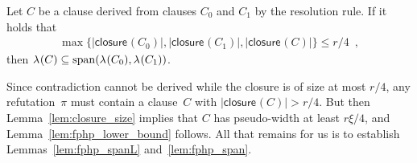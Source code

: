 \documentclass{theoretics}
\newcommand{\maxofexpr}[2][]{\max_{#1} \{ #2 \}}
\newcommand{\setsize}[1]{\lvert#1\rvert}
\newcommand{\eqcomma}{\enspace ,}
\newcommand{\reflem}[1]{Lemma~\ref{#1}}
\newcommand{\reftwolems}[2]{Lemmas~\ref{#1} and~\ref{#2}}
\newcommand{\refpi}{\pi}
\newcommand{\diff}{\xi}
\newcommand{\linmap}[1][]{\ensuremath \lambda_{{#1}}}
\newcommand{\linmapof}[2][]{\linmap[#1](#2)}
\newcommand{\pseudowidth}{pseudo-width\xspace}
\newcommand{\closure}[2][]{\mathsf{closure}_{{#1}}(#2)}
\newcommand{\spans}[1]{\mathrm{span} ( #1 )}
\numberwithin{equation}{section}
\begin{document}
\begin{lemma}\label{lem:fphp_span}
  Let $C$ be a clause derived from clauses $C_0$ and $C_1$ by the
  resolution rule. If it holds that
  \begin{align*}
    \maxofexpr{
    \setsize{\closure{C_0}},
    \setsize{\closure{C_1}},
    \setsize{\closure{C}}
    }
    \leq r/4 \eqcomma
  \end{align*}
  then
  $\linmapof{C} \subseteq \spans{\linmapof{C_0}, \linmapof{C_1}}$.
\end{lemma}

Since contradiction cannot be derived while the closure is of size at
most $r/4$, any refutation~$\refpi$ must contain a clause~$C$ with
$\setsize{ \closure{C} } > r/4$.  But then \reflem{lem:closure_size}
implies that $C$ has \pseudowidth at least $r \diff / 4$, and
\reflem{lem:fphp_lower_bound} follows.  All that remains for us is to
establish \reftwolems {lem:fphp_spanL} {lem:fphp_span}.
\end{document}
